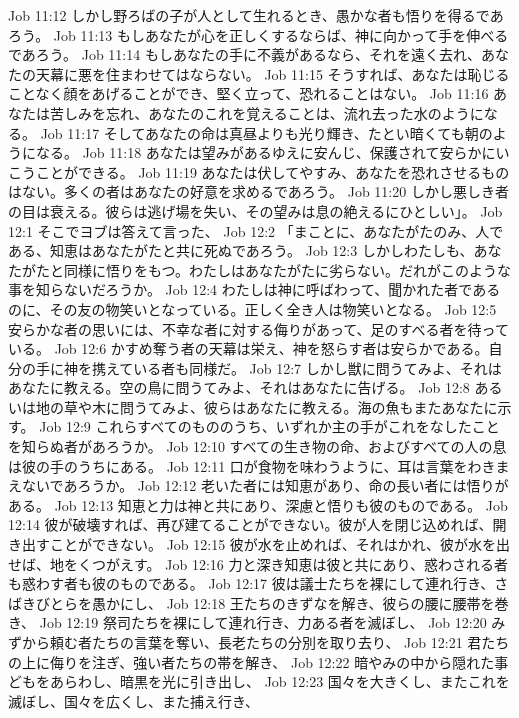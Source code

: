 Job 11:12  しかし野ろばの子が人として生れるとき、愚かな者も悟りを得るであろう。
Job 11:13  もしあなたが心を正しくするならば、神に向かって手を伸べるであろう。
Job 11:14  もしあなたの手に不義があるなら、それを遠く去れ、あなたの天幕に悪を住まわせてはならない。
Job 11:15  そうすれば、あなたは恥じることなく顔をあげることができ、堅く立って、恐れることはない。
Job 11:16  あなたは苦しみを忘れ、あなたのこれを覚えることは、流れ去った水のようになる。
Job 11:17  そしてあなたの命は真昼よりも光り輝き、たとい暗くても朝のようになる。
Job 11:18  あなたは望みがあるゆえに安んじ、保護されて安らかにいこうことができる。
Job 11:19  あなたは伏してやすみ、あなたを恐れさせるものはない。多くの者はあなたの好意を求めるであろう。
Job 11:20  しかし悪しき者の目は衰える。彼らは逃げ場を失い、その望みは息の絶えるにひとしい」。
Job 12:1  そこでヨブは答えて言った、
Job 12:2  「まことに、あなたがたのみ、人である、知恵はあなたがたと共に死ぬであろう。
Job 12:3  しかしわたしも、あなたがたと同様に悟りをもつ。わたしはあなたがたに劣らない。だれがこのような事を知らないだろうか。
Job 12:4  わたしは神に呼ばわって、聞かれた者であるのに、その友の物笑いとなっている。正しく全き人は物笑いとなる。
Job 12:5  安らかな者の思いには、不幸な者に対する侮りがあって、足のすべる者を待っている。
Job 12:6  かすめ奪う者の天幕は栄え、神を怒らす者は安らかである。自分の手に神を携えている者も同様だ。
Job 12:7  しかし獣に問うてみよ、それはあなたに教える。空の鳥に問うてみよ、それはあなたに告げる。
Job 12:8  あるいは地の草や木に問うてみよ、彼らはあなたに教える。海の魚もまたあなたに示す。
Job 12:9  これらすべてのもののうち、いずれか主の手がこれをなしたことを知らぬ者があろうか。
Job 12:10  すべての生き物の命、およびすべての人の息は彼の手のうちにある。
Job 12:11  口が食物を味わうように、耳は言葉をわきまえないであろうか。
Job 12:12  老いた者には知恵があり、命の長い者には悟りがある。
Job 12:13  知恵と力は神と共にあり、深慮と悟りも彼のものである。
Job 12:14  彼が破壊すれば、再び建てることができない。彼が人を閉じ込めれば、開き出すことができない。
Job 12:15  彼が水を止めれば、それはかれ、彼が水を出せば、地をくつがえす。
Job 12:16  力と深き知恵は彼と共にあり、惑わされる者も惑わす者も彼のものである。
Job 12:17  彼は議士たちを裸にして連れ行き、さばきびとらを愚かにし、
Job 12:18  王たちのきずなを解き、彼らの腰に腰帯を巻き、
Job 12:19  祭司たちを裸にして連れ行き、力ある者を滅ぼし、
Job 12:20  みずから頼む者たちの言葉を奪い、長老たちの分別を取り去り、
Job 12:21  君たちの上に侮りを注ぎ、強い者たちの帯を解き、
Job 12:22  暗やみの中から隠れた事どもをあらわし、暗黒を光に引き出し、
Job 12:23  国々を大きくし、またこれを滅ぼし、国々を広くし、また捕え行き、
